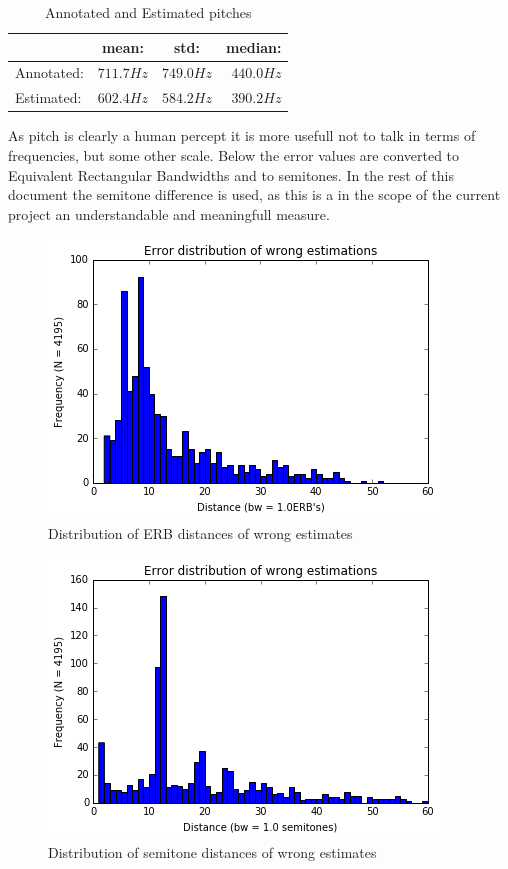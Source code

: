 \documentclass{article}
\begin{document}
\begin{table}[h]
    \begin{center}
        \begin{tabular}{ | l | c | c | r |}
            \hline
                        &   mean:       &   std:        &   median:     \\  \hline
            Annotated:  &   $711.7Hz$   &   $749.0Hz$   &   $440.0Hz$   \\  \hline
            Estimated:  &   $602.4Hz$   &   $584.2Hz$   &   $390.2Hz$   \\  
            \hline
        \end{tabular}
        \caption{Annotated and Estimated pitches}
        \label{table:pTag_pEst}
    \end{center}
\end{table}
As pitch is clearly a human percept it is more usefull not to talk in terms of frequencies, but some other scale. Below the error values are converted to Equivalent Rectangular Bandwidths and to semitones. In the rest of this document the semitone difference is used, as this is a in the scope of the current project an understandable and meaningfull measure. 

\begin{figure}
    \centering
    \includegraphics[scale=0.5]{img/erb_distribution.png}
    \caption{Distribution of ERB distances of wrong estimates}
    \label{fig:erb_distr}
\end{figure}

\begin{figure}
    \centering
    \includegraphics[scale=0.5]{img/st_distribution.png}
    \caption{Distribution of semitone distances of wrong estimates}
    \label{fig:st_distr}
\end{figure}
\end{document}
